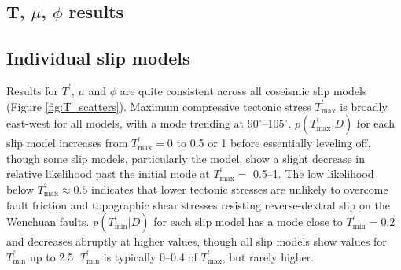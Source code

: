\documentclass[draft,jgrga]{AGUTeX}
\begin{document}
\begin{article}
\section{T, $\mu$, $\phi$ results}\label{t-mu-phi-results}

\subsection{Individual slip models}\label{individual-slip-models}

Results for $T^\prime$, $\mu$ and $\phi$ are quite consistent across all
coseismic slip models (Figure \ref{fig:T_scatters}). Maximum compressive
tectonic stress $T^\prime_{\mathrm{max}}$ is broadly east-west for all models,
with a mode trending at $90^{\circ}$--$105^{\circ}$.
$p(T^\prime_{\mathrm{max}}|D)$ for each slip model increases from
$T^\prime_{\mathrm{max}} = 0$ to 0.5 or 1 before essentially leveling off, though some
slip models, particularly the \citet{qi2011} model, show a
slight decrease in relative likelihood past the initial mode at
$T^\prime_{\mathrm{max}} =$ 0.5--1.
The low likelihood below $T^\prime_{\mathrm{max}} \approx 0.5$ indicates that lower
tectonic stresses are unlikely to overcome fault friction and
topographic shear stresses resisting reverse-dextral slip on the
Wenchuan faults. $p(T^\prime_{\mathrm{min}} | D)$ for each slip model
has a mode close to $T^\prime_{\mathrm{min}} = 0.2 $ and decreases
abruptly at higher values, though all slip models show values for
$T^\prime_{\mathrm{min}}$ up to 2.5. $T^\prime_{\mathrm{min}}$ is
typically 0--0.4 of $T^\prime_{\mathrm{max}}$, but rarely higher.



\end{article}
\end{document}

